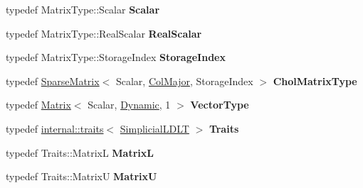 \begin{DoxyCompactItemize}
\item 
\mbox{\label{group___sparse_cholesky___module_a95c4c66916a223d1b9ab67ef1f40ddea}} 
typedef Matrix\+Type\+::\+Scalar {\bfseries Scalar}
\item 
\mbox{\label{group___sparse_cholesky___module_a2d8d8a511f80f5fc755ec719d8ec468f}} 
typedef Matrix\+Type\+::\+Real\+Scalar {\bfseries Real\+Scalar}
\item 
\mbox{\label{group___sparse_cholesky___module_a653560f255aa6cf3a3c01bf0cb33efcd}} 
typedef Matrix\+Type\+::\+Storage\+Index {\bfseries Storage\+Index}
\item 
\mbox{\label{group___sparse_cholesky___module_aefb2fe5145c99758a17687e0b46b6984}} 
typedef \hyperlink{group___sparse_core___module_class_eigen_1_1_sparse_matrix}{Sparse\+Matrix}$<$ Scalar, \hyperlink{group__enums_ggaacded1a18ae58b0f554751f6cdf9eb13a0cbd4bdd0abcfc0224c5fcb5e4f6669a}{Col\+Major}, Storage\+Index $>$ {\bfseries Chol\+Matrix\+Type}
\item 
\mbox{\label{group___sparse_cholesky___module_a46600ac1a333de3d432e3aa0a9c6ce4d}} 
typedef \hyperlink{group___core___module_class_eigen_1_1_matrix}{Matrix}$<$ Scalar, \hyperlink{namespace_eigen_ad81fa7195215a0ce30017dfac309f0b2}{Dynamic}, 1 $>$ {\bfseries Vector\+Type}
\item 
\mbox{\label{group___sparse_cholesky___module_adcb202f95627052f2fcec1a443846c47}} 
typedef \hyperlink{struct_eigen_1_1internal_1_1traits}{internal\+::traits}$<$ \hyperlink{group___sparse_cholesky___module_class_eigen_1_1_simplicial_l_d_l_t}{Simplicial\+L\+D\+LT} $>$ {\bfseries Traits}
\item 
\mbox{\label{group___sparse_cholesky___module_acfee89670dd30e7a362daf07993dc34f}} 
typedef Traits\+::\+MatrixL {\bfseries MatrixL}
\item 
\mbox{\label{group___sparse_cholesky___module_a44fd1f38eca9ea9eeba9947466104c18}} 
typedef Traits\+::\+MatrixU {\bfseries MatrixU}
\end{DoxyCompactItemize}
